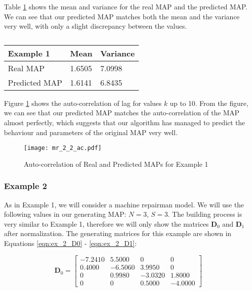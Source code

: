 \documentclass[a4paper,11pt,titlepage]{article}
\begin{document}
Table \ref{table:ex1_mean_var} shows the mean and variance for the real MAP and the predicted MAP. We can see that our predicted MAP matches both the mean and the variance very well, with only a slight discrepancy between the values. 

\begin{table}[h!]
\begin{center}
\begin{tabular}{|l|l|l|}
\hline
Example 1 & Mean & Variance \\ \hline
Real MAP & 1.6505 & 7.0998 \\ \hline
Predicted MAP & 1.6141 & 6.8435 \\ \hline
\end{tabular}
\caption{}
\label{table:ex1_mean_var}
\end{center}
\end{table}

Figure \ref{fig:mr_2_2_ac} shows the auto-correlation of lag for values $k$ up to 10. From the figure, we can see that our predicted MAP matches the auto-correlation of the MAP almost perfectly, which suggests that our algorithm has managed to predict the behaviour and parameters of the original MAP very well. 

\begin{figure}[h!]
\begin{center}
\texttt{[image: mr\_2\_2\_ac.pdf]}
\caption{Auto-correlation of Real and Predicted MAPs for Example 1}
\label{fig:mr_2_2_ac}
\end{center}
\end{figure}

\subsubsection{Example 2}

As in Example 1, we will consider a machine repairman model. We will use the following values in our generating MAP: $N=3$, $S=3$. The building process is very similar to Example 1, therefore we will only show the matrices $\mathbf{D}_0$ and $\mathbf{D}_1$ after normalization. The generating matrices for this example are shown in Equations \ref{eqn:ex_2_D0} - \ref{eqn:ex_2_D1}: 
    
\begin{equation}
  \mathbf{D}_0 = \begin{bmatrix}
 -7.2410  &  5.5000  &  0  &    0 \\
0.4000  & -6.5060  &  3.9950  & 0 \\
0   & 0.9980 &  -3.0320  &  1.8000 \\
0   &  0  &  0.5000 &  -4.0000 
    \end{bmatrix}
    \label{eqn:ex_2_D0}
\end{equation} \\
    
\end{document}
